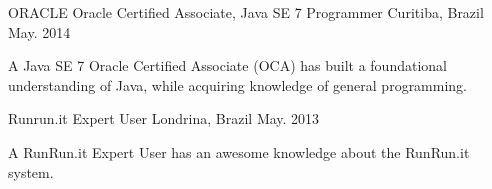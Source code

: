 


\begin{cventries}

  \cventry
    {ORACLE} %
    {Oracle Certified Associate, Java SE 7 Programmer} %
    {Curitiba, Brazil} %
    {May. 2014} %
    {
      \begin{cvitems} %
        \item {A Java SE 7 Oracle Certified Associate (OCA) has built a foundational understanding of Java, while acquiring knowledge of general programming.}
      \end{cvitems}
    }

  \cventry
    {Runrun.it} %
    {Expert User} %
    {Londrina, Brazil} %
    {May. 2013} %
    {
      \begin{cvitems} %
        \item {A RunRun.it Expert User has an awesome knowledge about the RunRun.it system.}
      \end{cvitems}
    }
\end{cventries}
